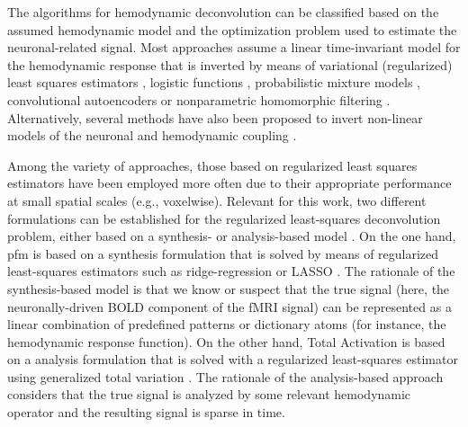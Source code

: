 The algorithms for hemodynamic deconvolution can be classified based on the
assumed hemodynamic model and the optimization problem used to estimate the
neuronal-related signal. Most approaches assume a linear time-invariant model
for the hemodynamic response that is inverted by means of variational
(regularized) least squares estimators
\citep{Glover1999DeconvolutionImpulseResponse,Gitelman2003Modelingregionalpsychophysiologic,
Gaudes2010Detectioncharacterizationsingle,Gaudes2012Structuredsparsedeconvolution,
Gaudes2013Paradigmfreemapping,CaballeroGaudes2019deconvolutionalgorithmmulti,
HernandezGarcia2011Neuronaleventdetection,Karahanoglu2013TotalactivationfMRI,
Cherkaoui2019Sparsitybasedblind,
Huetel2021Hemodynamicmatrixfactorization,Costantini2022Anisotropic4DFiltering},
logistic functions
\citep{Bush2013Decodingneuralevents,Bush2015deconvolutionbasedapproach,
Loula2018DecodingfMRIactivity}, probabilistic mixture models
\citep{Pidnebesna2019EstimatingSparseNeuronal}, convolutional autoencoders
\citep{Huetel2018NeuralActivationEstimation} or nonparametric homomorphic
filtering \citep{Sreenivasan2015NonparametricHemodynamicDeconvolution}.
Alternatively, several methods have also been proposed to invert non-linear
models of the neuronal and hemodynamic coupling
\citep{Riera2004statespacemodel,Penny2005Bilineardynamicalsystems,Friston2008DEMvariationaltreatment,
Havlicek2011Dynamicmodelingneuronal,Aslan2016Jointstateparameter,
Madi2017HybridCubatureKalman,RuizEuler2018NonlinearDeconvolutionSampling}.

Among the variety of approaches, those based on regularized least squares
estimators have been employed more often due to their appropriate performance at
small spatial scales (e.g., voxelwise). Relevant for this work, two different
formulations can be established for the regularized least-squares deconvolution
problem, either based on a synthesis- or analysis-based model
\citep{Elad2007Analysisversussynthesis,Ortelli2019Synthesisanalysistotal}. On
the one hand, \acrlong*{pfm} is based on a synthesis formulation that is solved
by means of regularized least-squares estimators such as ridge-regression
\citep{Gaudes2010Detectioncharacterizationsingle} or LASSO
\citep{Gaudes2013Paradigmfreemapping}. The rationale of the synthesis-based
model is that we know or suspect that the true signal (here, the
neuronally-driven BOLD component of the fMRI signal) can be represented as a
linear combination of predefined patterns or dictionary atoms (for instance, the
hemodynamic response function). On the other hand, Total Activation is based on
a analysis formulation that is solved with a regularized least-squares estimator
using generalized total variation
\citep{Karahanoglu2011SignalProcessingApproach,Karahanoglu2013TotalactivationfMRI}.
The rationale of the analysis-based approach considers that the true signal is
analyzed by some relevant hemodynamic operator
\citep{Khalidov2011ActiveletsWaveletssparse} and the resulting signal is sparse
in time.

